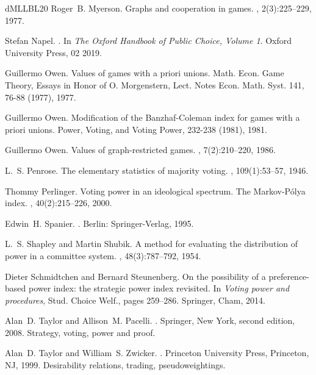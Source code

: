 \documentclass[11pt]{amsart}
\theoremstyle{plain}
\theoremstyle{definition}
\theoremstyle{remark}
\begin{document}
\begin{thebibliography}{dMLLBL20}
Roger~B. Myerson.
\newblock Graphs and cooperation in games.
, 2(3):225--229, 1977.

Stefan Napel.
.
\newblock In {\em {The Oxford Handbook of Public Choice, Volume 1}}. Oxford
  University Press, 02 2019.

Guillermo Owen.
\newblock Values of games with a priori unions.
\newblock Math. {Econ}. {Game} {Theory}, {Essays} in {Honor} of {O}.
  {Morgenstern}, {Lect}. {Notes} {Econ}. {Math}. {Syst}. 141, 76-88 (1977),
  1977.

Guillermo Owen.
\newblock Modification of the {Banzhaf}-{Coleman} index for games with a priori
  unions.
\newblock Power, Voting, and Voting Power, 232-238 (1981), 1981.

Guillermo Owen.
\newblock Values of graph-restricted games.
, 7(2):210--220, 1986.

L.~S. Penrose.
\newblock The elementary statistics of majority voting.
, 109(1):53--57, 1946.

Thommy Perlinger.
\newblock Voting power in an ideological spectrum. {The} {Markov}-{P{\'o}lya}
  index.
, 40(2):215--226, 2000.

Edwin~H. Spanier.
.
\newblock Berlin: Springer-Verlag, 1995.

L.~S. Shapley and Martin Shubik.
\newblock A method for evaluating the distribution of power in a committee
  system.
, 48(3):787–792, 1954.

Dieter Schmidtchen and Bernard Steunenberg.
\newblock On the possibility of a preference-based power index: the strategic
  power index revisited.
\newblock In {\em Voting power and procedures}, Stud. Choice Welf., pages
  259--286. Springer, Cham, 2014.

Alan~D. Taylor and Allison~M. Pacelli.
.
\newblock Springer, New York, second edition, 2008.
\newblock Strategy, voting, power and proof.

Alan~D. Taylor and William~S. Zwicker.
.
\newblock Princeton University Press, Princeton, NJ, 1999.
\newblock Desirability relations, trading, pseudoweightings.


\end{thebibliography}
\end{document}
